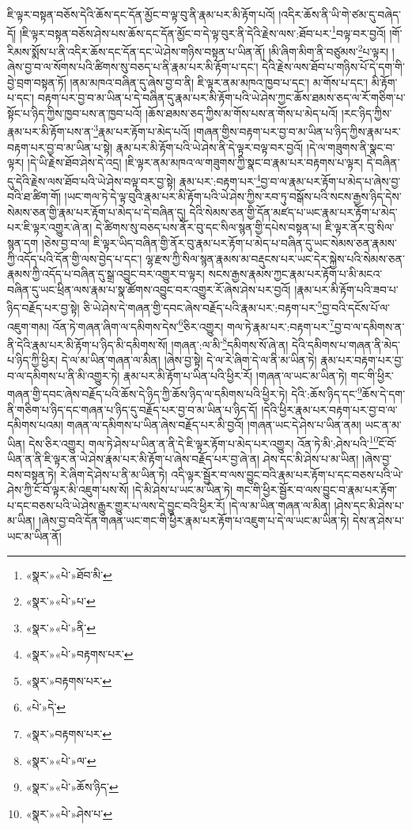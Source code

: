 ཇི་ལྟར་བསྟན་བཅོས་དེའི་ཆོས་དང་དོན་མྱོང་བ་ལྟ་བུ་ནི་རྣམ་པར་མི་རྟོག་པའོ། །འདིར་ཆོས་ནི་ཡི་གེ་ཙམ་དུ་བཞེད་དོ། །ཇི་ལྟར་བསྟན་བཅོས་ཤེས་པས་ཆོས་དང་དོན་མྱོང་བ་དེ་ལྟ་བུར་ནི་དེའི་རྗེས་ལས་:ཐོབ་པར་\footnote{«སྣར་»«པེ་»ཐོབ་མི་}བལྟ་བར་བྱའོ། །གོ་རིམས་སྨོས་པ་ནི་འདིར་ཆོས་དང་དོན་དང་ཡེ་ཤེས་གཉིས་བསྟན་པ་ཡིན་ནོ། །མི་ཞིག་མིག་ནི་བཙུམས་\footnote{«སྣར་»«པེ་»པ་}པ་ལྟར། །ཞེས་བྱ་བ་ལ་སོགས་པའི་ཚིགས་སུ་བཅད་པ་ནི་རྣམ་པར་མི་རྟོག་པ་དང་། དེའི་རྗེས་ལས་ཐོབ་པ་གཉིས་པོ་དེ་དག་གི་བྱེ་བྲག་བསྟན་ཏོ། །ནམ་མཁའ་བཞིན་དུ་ཞེས་བྱ་བ་ནི། ཇི་ལྟར་ནམ་མཁའ་ཁྱབ་པ་དང་། མ་གོས་པ་དང་། མི་རྟོག་པ་དང་། བརྟག་པར་བྱ་བ་མ་ཡིན་པ་དེ་བཞིན་དུ་རྣམ་པར་མི་རྟོག་པའི་ཡེ་ཤེས་ཀྱང་ཆོས་ཐམས་ཅད་ལ་རོ་གཅིག་པ་སྟོང་པ་ཉིད་ཀྱིས་ཁྱབ་པས་ན་ཁྱབ་པའོ། །ཆོས་ཐམས་ཅད་ཀྱིས་མ་གོས་པས་ན་གོས་པ་མེད་པའོ། །རང་ཉིད་ཀྱིས་རྣམ་པར་མི་རྟོག་པས་ན་\footnote{«སྣར་»«པེ་»ནི་}རྣམ་པར་རྟོག་པ་མེད་པའོ། །གཞན་གྱིས་བརྟག་པར་བྱ་བ་མ་ཡིན་པ་ཉིད་ཀྱིས་རྣམ་པར་བརྟག་པར་བྱ་བ་མ་ཡིན་པ་སྟེ། རྣམ་པར་མི་རྟོག་པའི་ཡེ་ཤེས་ནི་དེ་ལྟར་བལྟ་བར་བྱའོ། །དེ་ལ་གཟུགས་ནི་སྣང་བ་ལྟར། །དེ་ཡི་རྗེས་ཐོབ་ཤེས་དེ་འདྲ། །ཇི་ལྟར་ནམ་མཁའ་ལ་གཟུགས་ཀྱི་སྣང་བ་རྣམ་པར་བརྟགས་པ་ལྟར། དེ་བཞིན་དུ་དེའི་རྗེས་ལས་ཐོབ་པའི་ཡེ་ཤེས་བལྟ་བར་བྱ་སྟེ། རྣམ་པར་:བརྟག་པར་\footnote{«སྣར་»«པེ་»བརྟགས་པར་}བྱ་བ་ལ་རྣམ་པར་རྟོག་པ་མེད་པ་ཞེས་བྱ་བའི་ཐ་ཚིག་གོ། །ཡང་གལ་ཏེ་དེ་ལྟ་བུའི་རྣམ་པར་མི་རྟོག་པའི་ཡེ་ཤེས་ཀྱིས་རབ་ཏུ་བསྒོས་པའི་སངས་རྒྱས་ཉིད་དེས་སེམས་ཅན་གྱི་རྣམ་པར་རྟོག་པ་མེད་པ་དེ་བཞིན་དུ། དེའི་སེམས་ཅན་གྱི་དོན་མཛད་པ་ཡང་རྣམ་པར་རྟོག་པ་མེད་པར་ཇི་ལྟར་འགྱུར་ཞེ་ན། དེ་ཚིགས་སུ་བཅད་པས་ནོར་བུ་དང་སིལ་སྙན་གྱི་དཔེས་བསྟན་པ། ཇི་ལྟར་ནོར་བུ་སིལ་སྙན་དག །ཅེས་བྱ་བ་ལ། ཇི་ལྟར་ཡིད་བཞིན་གྱི་ནོར་བུ་རྣམ་པར་རྟོག་པ་མེད་པ་བཞིན་དུ་ཡང་སེམས་ཅན་རྣམས་ཀྱི་འདོད་པའི་དོན་གྱི་ལས་བྱེད་པ་དང་། ལྷ་རྫས་ཀྱི་སིལ་སྙན་རྣམས་མ་བརྡུངས་པར་ཡང་དེར་སྐྱེས་པའི་སེམས་ཅན་རྣམས་ཀྱི་འདོད་པ་བཞིན་དུ་སྒྲ་འབྱུང་བར་འགྱུར་བ་ལྟར། སངས་རྒྱས་རྣམས་ཀྱང་རྣམ་པར་རྟོག་པ་མི་མངའ་བཞིན་དུ་ཡང་ཕྲིན་ལས་རྣམ་པ་སྣ་ཚོགས་འབྱུང་བར་འགྱུར་རོ་ཞེས་ཤེས་པར་བྱའོ། །རྣམ་པར་མི་རྟོག་པའི་ཟབ་པ་ཉིད་བརྗོད་པར་བྱ་སྟེ། ཅི་ཡེ་ཤེས་དེ་གཞན་གྱི་དབང་ཞེས་བརྗོད་པའི་རྣམ་པར་:བརྟག་པར་\footnote{«སྣར་»བརྟགས་པར་}བྱ་བའི་དངོས་པོ་ལ་འཇུག་གམ། འོན་ཏེ་གཞན་ཞིག་ལ་དམིགས་དེས་\footnote{«པེ་»དེ་}ཅིར་འགྱུར། གལ་ཏེ་རྣམ་པར་:བརྟག་པར་\footnote{«སྣར་»བརྟགས་པར་}བྱ་བ་ལ་དམིགས་ན་ནི་དེའི་རྣམ་པར་མི་རྟོག་པ་ཉིད་མི་དམིགས་སོ། །གཞན་:ལ་མི་\footnote{«སྣར་»«པེ་»ལ་}དམིགས་སོ་ཞེ་ན། དེའི་དམིགས་པ་གཞན་ནི་མེད་པ་ཉིད་ཀྱི་ཕྱིར། དེ་ལ་མ་ཡིན་གཞན་ལ་མིན། །ཞེས་བྱ་སྟེ། དེ་ལ་རེ་ཞིག་དེ་ལ་ནི་མ་ཡིན་ཏེ། རྣམ་པར་བརྟག་པར་བྱ་བ་ལ་དམིགས་པ་ནི་མི་འགྱུར་ཏེ། རྣམ་པར་མི་རྟོག་པ་ཡིན་པའི་ཕྱིར་རོ། །གཞན་ལ་ཡང་མ་ཡིན་ཏེ། གང་གི་ཕྱིར་གཞན་གྱི་དབང་ཞེས་བརྗོད་པའི་ཆོས་དེ་ཉིད་ཀྱི་ཆོས་ཉིད་ལ་དམིགས་པའི་ཕྱིར་ཏེ། དེའི་:ཆོས་ཉིད་དང་\footnote{«སྣར་»«པེ་»ཆོས་ཉིད་}ཆོས་དེ་དག་ནི་གཅིག་པ་ཉིད་དང་གཞན་པ་ཉིད་དུ་བརྗོད་པར་བྱ་བ་མ་ཡིན་པ་ཉིད་དོ། །དེའི་ཕྱིར་རྣམ་པར་བརྟག་པར་བྱ་བ་ལ་དམིགས་པའམ། གཞན་ལ་དམིགས་པ་ཡིན་ཞེས་བརྗོད་པར་མི་བྱའོ། །གཞན་ཡང་དེ་ཤེས་པ་ཡིན་ནམ། ཡང་ན་མ་ཡིན། དེས་ཅིར་འགྱུར། གལ་ཏེ་ཤེས་པ་ཡིན་ན་ནི་དེ་ཇི་ལྟར་རྟོག་པ་མེད་པར་འགྱུར། འོན་ཏེ་མི་:ཤེས་པའི་\footnote{«སྣར་»«པེ་»ཤེས་པ་}ངོ་བོ་ཡིན་ན་ནི་ཇི་ལྟར་ན་ཡེ་ཤེས་རྣམ་པར་མི་རྟོག་པ་ཞེས་བརྗོད་པར་བྱ་ཞེ་ན། ཤེས་དང་མི་ཤེས་པ་མ་ཡིན། །ཞེས་བྱ་བས་བསྟན་ཏེ། རེ་ཞིག་དེ་ཤེས་པ་ནི་མ་ཡིན་ཏེ། འདི་ལྟར་སྦྱོར་བ་ལས་བྱུང་བའི་རྣམ་པར་རྟོག་པ་དང་བཅས་པའི་ཡེ་ཤེས་ཀྱི་ངོ་བོ་ལྟར་མི་འཇུག་པས་སོ། །དེ་མི་ཤེས་པ་ཡང་མ་ཡིན་ཏེ། གང་གི་ཕྱིར་སྦྱོར་བ་ལས་བྱུང་བ་རྣམ་པར་རྟོག་པ་དང་བཅས་པའི་ཡེ་ཤེས་རྒྱུར་གྱུར་པ་ལས་དེ་བྱུང་བའི་ཕྱིར་རོ། །དེ་ལ་མ་ཡིན་གཞན་ལ་མིན། །ཤེས་དང་མི་ཤེས་པ་མ་ཡིན། །ཞེས་བྱ་བའི་དོན་གཞན་ཡང་གང་གི་ཕྱིར་རྣམ་པར་རྟོག་པ་འཇུག་པ་དེ་ལ་ཡང་མ་ཡིན་ཏེ། དེས་ན་ཤེས་པ་ཡང་མ་ཡིན་ནོ། 